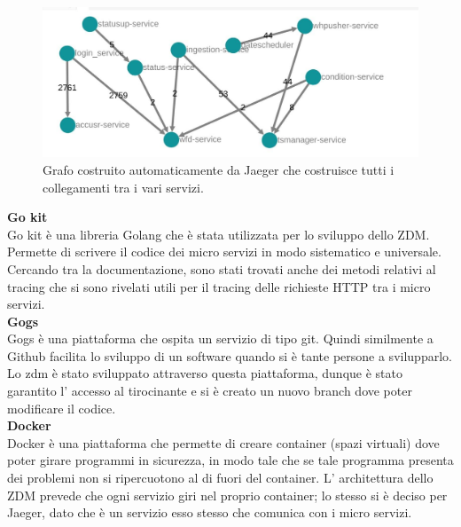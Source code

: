 \documentclass[a4paper,12pt,titlepage,italian,openany]{report}
\begin{document}
\begin{figure}[H]
    \includegraphics[scale=0.4]{grafo.jpg}
    \centering
    \caption{Grafo costruito automaticamente da Jaeger che costruisce tutti i collegamenti tra i vari servizi.}
\end{figure}
\newpage
\textbf{Go kit}\\
Go kit\cite{go:2} è una libreria Golang che è stata utilizzata per lo sviluppo dello ZDM\cite{zdm:1}. Permette di scrivere il codice dei micro servizi in modo sistematico e universale.\\ Cercando tra la documentazione, sono stati trovati anche dei metodi relativi al tracing che si sono rivelati utili
per il tracing delle richieste HTTP tra i micro servizi. \\[12pt]

\textbf{Gogs}\\
Gogs\cite{gogs:1} è una piattaforma che ospita un servizio di tipo git. Quindi similmente a Github facilita lo sviluppo di un software quando si è tante persone a svilupparlo. Lo zdm è stato sviluppato attraverso questa piattaforma, dunque è stato garantito l' accesso al tirocinante e si è creato un nuovo branch dove poter modificare il codice. \\[12pt]

\textbf{Docker}\\
Docker\cite{docker:1} è una piattaforma che permette di creare container (spazi virtuali) dove poter girare programmi in sicurezza, in modo tale che se tale programma presenta dei problemi non si ripercuotono al di fuori del container. L' architettura dello ZDM\cite{zdm:1} prevede che ogni servizio giri nel proprio container; lo stesso si è deciso per Jaeger, dato che è un servizio esso stesso che comunica con i micro servizi.\\[12pt]
\end{document}
